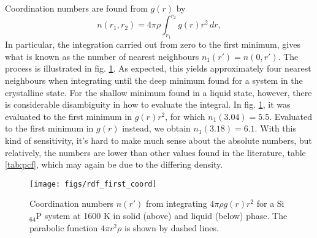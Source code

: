 \documentclass[11pt,bibliography=totoc,index=totoc]{scrbook}   %
\begin{document}
Coordination numbers are found from $g(r)$ by
\begin{equation}
    n(r_1,r_2) = 4\pi\rho \int_{r_1}^{r_2} g(r) r^2 \,dr,
    \label{eq:coordno}
\end{equation}
In particular, the integration carried out from zero to the first minimum, 
gives what is known as the number of nearest neighbours $n_1(r') = n(0,r')$.\cite[7]{Waseda:1980}
The process is illustrated in fig. \ref{fig:rdffirstcoord}.
As expected, this yields approximately four nearest neighbours when integrating until the deep minimum found for a system in the crystalline state.
For the shallow minimum found in a liquid state, however, there is considerable disambiguity in how to evaluate the integral.
In fig. \ref{fig:rdffirstcoord}, it was evaluated to 
the first minimum in $g(r)r^2$, for which $n_1(3.04)=5.5$.
Evaluated to the first minimum in $g(r)$ instead, we obtain $n_1(3.18) = 6.1$. 
With this kind of sensitivity, it's hard to make much sense about the absolute numbers,
but relatively, the numbers are lower than other values found in the literature, 
table \ref{tab:pcf}, which may again be due to the differing density.


\begin{figure}[htbp]
  \centering
  \texttt{[image: figs/rdf\_first\_coord]}
  \caption{Coordination numbers $n(r')$ from integrating $4\pi\rho g(r) r^2 $ for a Si$_64$P system
      at 1600 K in solid (above) and liquid (below) phase.
     The parabolic function $4\pi r^2 \rho$ is shown by dashed lines.
    }
  \label{fig:rdffirstcoord}
\end{figure}
\end{document}

